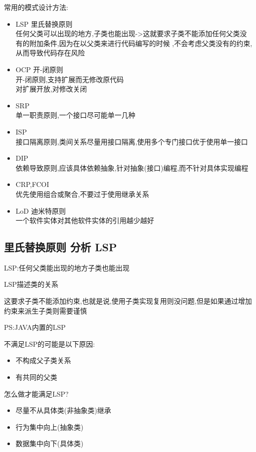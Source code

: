 \documentclass[UTF8,a4paper]{ctexart}
\begin{document}
常用的模式设计方法:
\begin{itemize}
  \item LSP 里氏替换原则\\
  任何父类可以出现的地方,子类也能出现->这就要求子类不能添加任何父类没有的附加条件,因为在以父类来进行代码编写的时候
  ,不会考虑父类没有的约束,从而导致代码存在风险
  \item OCP 开-闭原则\\
  开-闭原则,支持扩展而无修改原代码\\
  对扩展开放,对修改关闭
  \item SRP \\
  单一职责原则,一个接口尽可能单一几种
  \item ISP\\
  接口隔离原则,类间关系尽量用接口隔离,使用多个专门接口优于使用单一接口
  \item DIP\\
  依赖导致原则,应该具体依赖抽象,针对抽象(接口)编程,而不针对具体实现编程
  \item CRP,FCOI\\
  优先使用组合或聚合,不要过于使用继承关系
  \item LoD 迪米特原则\\
  一个软件实体对其他软件实体的引用越少越好
\end{itemize}

\subsection{里氏替换原则 分析 LSP}
LSP:任何父类能出现的地方子类也能出现

LSP描述类的关系

这要求子类不能添加约束,也就是说,使用子类实现复用则没问题,但是如果通过增加约束来派生子类则需要谨慎

PS:JAVA内置的LSP

不满足LSP的可能是以下原因:
\begin{itemize}
  \item 不构成父子类关系

  \item 有共同的父类
\end{itemize}

怎么做才能满足LSP?
\begin{itemize}
  \item 尽量不从具体类(非抽象类)继承
  \item 行为集中向上(抽象类)
  \item 数据集中向下(具体类)
\end{itemize}
\end{document}
